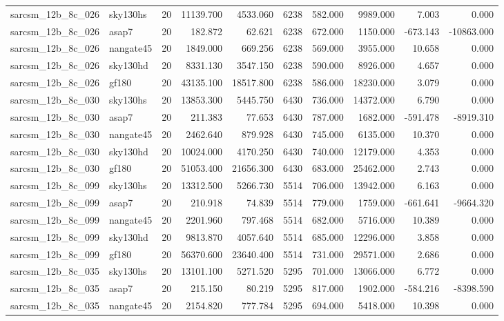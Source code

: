 \begin{longtable}{llrrrrrrrr}
sarcsm\_12b\_8c\_026 & sky130hs & 20 & 11139.700 & 4533.060 & 6238 & 582.000 & 9989.000 & 7.003 & 0.000 \\
sarcsm\_12b\_8c\_026 & asap7 & 20 & 182.872 & 62.621 & 6238 & 672.000 & 1150.000 & -673.143 & -10863.000 \\
sarcsm\_12b\_8c\_026 & nangate45 & 20 & 1849.000 & 669.256 & 6238 & 569.000 & 3955.000 & 10.658 & 0.000 \\
sarcsm\_12b\_8c\_026 & sky130hd & 20 & 8331.130 & 3547.150 & 6238 & 590.000 & 8926.000 & 4.657 & 0.000 \\
sarcsm\_12b\_8c\_026 & gf180 & 20 & 43135.100 & 18517.800 & 6238 & 586.000 & 18230.000 & 3.079 & 0.000 \\
sarcsm\_12b\_8c\_030 & sky130hs & 20 & 13853.300 & 5445.750 & 6430 & 736.000 & 14372.000 & 6.790 & 0.000 \\
sarcsm\_12b\_8c\_030 & asap7 & 20 & 211.383 & 77.653 & 6430 & 787.000 & 1682.000 & -591.478 & -8919.310 \\
sarcsm\_12b\_8c\_030 & nangate45 & 20 & 2462.640 & 879.928 & 6430 & 745.000 & 6135.000 & 10.370 & 0.000 \\
sarcsm\_12b\_8c\_030 & sky130hd & 20 & 10024.000 & 4170.250 & 6430 & 740.000 & 12179.000 & 4.353 & 0.000 \\
sarcsm\_12b\_8c\_030 & gf180 & 20 & 51053.400 & 21656.300 & 6430 & 683.000 & 25462.000 & 2.743 & 0.000 \\
sarcsm\_12b\_8c\_099 & sky130hs & 20 & 13312.500 & 5266.730 & 5514 & 706.000 & 13942.000 & 6.163 & 0.000 \\
sarcsm\_12b\_8c\_099 & asap7 & 20 & 210.918 & 74.839 & 5514 & 779.000 & 1759.000 & -661.641 & -9664.320 \\
sarcsm\_12b\_8c\_099 & nangate45 & 20 & 2201.960 & 797.468 & 5514 & 682.000 & 5716.000 & 10.389 & 0.000 \\
sarcsm\_12b\_8c\_099 & sky130hd & 20 & 9813.870 & 4057.640 & 5514 & 685.000 & 12296.000 & 3.858 & 0.000 \\
sarcsm\_12b\_8c\_099 & gf180 & 20 & 56370.600 & 23640.400 & 5514 & 731.000 & 29571.000 & 2.686 & 0.000 \\
sarcsm\_12b\_8c\_035 & sky130hs & 20 & 13101.100 & 5271.520 & 5295 & 701.000 & 13066.000 & 6.772 & 0.000 \\
sarcsm\_12b\_8c\_035 & asap7 & 20 & 215.150 & 80.219 & 5295 & 817.000 & 1902.000 & -584.216 & -8398.590 \\
sarcsm\_12b\_8c\_035 & nangate45 & 20 & 2154.820 & 777.784 & 5295 & 694.000 & 5418.000 & 10.398 & 0.000 \\

\end{longtable}
